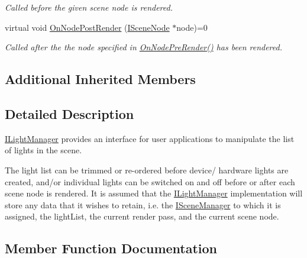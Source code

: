 \begin{DoxyCompactItemize}
\begin{DoxyCompactList}\small\item\em Called before the given scene node is rendered. \end{DoxyCompactList}\item 
virtual void \hyperlink{classirr_1_1scene_1_1ILightManager_aa9e6195a3a783a97f440a4b947090ab0}{On\+Node\+Post\+Render} (\hyperlink{classirr_1_1scene_1_1ISceneNode}{I\+Scene\+Node} $\ast$node)=0
\begin{DoxyCompactList}\small\item\em Called after the the node specified in \hyperlink{classirr_1_1scene_1_1ILightManager_a23ae7bdf54613e6dd41d4138cb6f5edc}{On\+Node\+Pre\+Render()} has been rendered. \end{DoxyCompactList}\end{DoxyCompactItemize}
\subsection*{Additional Inherited Members}


\subsection{Detailed Description}
\hyperlink{classirr_1_1scene_1_1ILightManager}{I\+Light\+Manager} provides an interface for user applications to manipulate the list of lights in the scene. 

The light list can be trimmed or re-\/ordered before device/ hardware lights are created, and/or individual lights can be switched on and off before or after each scene node is rendered. It is assumed that the \hyperlink{classirr_1_1scene_1_1ILightManager}{I\+Light\+Manager} implementation will store any data that it wishes to retain, i.\+e. the \hyperlink{classirr_1_1scene_1_1ISceneManager}{I\+Scene\+Manager} to which it is assigned, the light\+List, the current render pass, and the current scene node. 

\subsection{Member Function Documentation}
